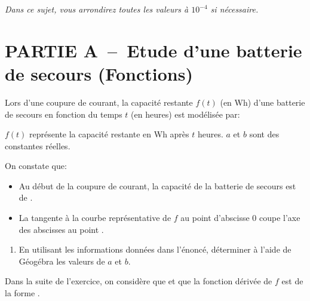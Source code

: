 
\pagestyle{DS_FP}


\medskip

\emph{Dans ce sujet, vous arrondirez toutes les valeurs à $10^{-4}$ si nécessaire.}


\section*{PARTIE A~--~Etude d'une batterie de secours (Fonctions)}

Lors d'une coupure de courant, la capacité restante $f(t)$ (en Wh) d'une batterie de secours en fonction du temps $t$ (en heures) est modélisée par:

 \quad $f(t)$ représente la capacité restante en Wh après $t$ heures. $a$ et $b$ sont des constantes réelles.

On constate que:
\begin{itemize}
    \item Au début de la coupure de courant, la capacité de la batterie de secours est de .
    \item La tangente à la courbe représentative de $f$ au point d'abscisse 0 coupe l'axe des abscisses au point .
\end{itemize}

 \begin{enumerate}[resume=monDS]

        
     \item En utilisant les informations données dans l'énoncé, déterminer à l'aide de Géogébra les valeurs de $a$ et $b$. \hfill{} 

    \appelprof{}
\end{enumerate}

\bigskip

Dans la suite de l'exercice, on considère que  et que la fonction dérivée de $f$ est de la forme .

